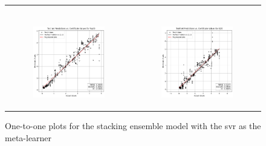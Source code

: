 \begin{figure}
{\begin{tabular}{cc}
\begin{subfigure}{0.5\textwidth}
            \end{subfigure} \\
            \begin{subfigure}{0.5\textwidth}
                \includegraphics[width=\textwidth]{images/one_to_one/svr/Na2O.png}
            \end{subfigure} & \hspace{3cm}
            \begin{subfigure}{0.5\textwidth}
                \includegraphics[width=\textwidth]{images/one_to_one/svr/K2O.png}
            \end{subfigure}
        \end{tabular}
    }
    \caption{One-to-one plots for the stacking ensemble model with the \gls{svr} as the meta-learner}
    \label{fig:svr_one_to_one}
\end{figure}
